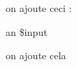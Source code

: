 \documentclass{article}
\begin{document}
on ajoute ceci :

an \$input

on ajoute cela
\end{document}
